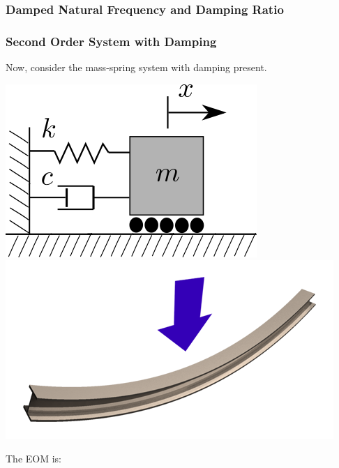 \documentclass[fleqn]{beamer} %
\newcommand{\sectionIIsubsectionItitle}{Damped Natural Frequency and Damping Ratio}
\begin{document}
			\begin{frame}[label=sectionIIsubsectionI]
				\frametitle{\sectionIIsubsectionItitle}
				\bigskip

				\frametitle{Second Order System with Damping}

				\large Now, consider the mass-spring system with damping present.\vspc

					\includegraphics[scale=.4]{images/mass_spring_02.png} \hspc \includegraphics[scale=.20]{images/beam_bending_01.png} 

				\large The EOM is:\vspc

					 \vspc
					\vspc

			
				\btVFill
			\end{frame}
\end{document}
